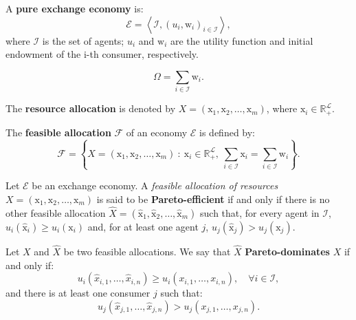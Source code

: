 \documentclass[8pt,a4paper]{extarticle}
\begin{document}
\begin{multicols}{3}
  \begin{boxdef}
    A \textbf{pure exchange economy} is: $$\mathcal{E} = \left\langle \mathcal{I}, (u_i, \mathrm{w}_i)_{i \in \mathcal{I}} \right\rangle,$$  where $\mathcal{I}$ is the set of agents; $u_i$ and $\mathrm{w}_i$ are the utility function and initial endowment of the i-th consumer, respectively.
  \end{boxdef}

  \begin{boxdef}
    \[
      \Omega = \sum_{i \in \mathcal{I}} \mathrm{w}_i
      .\]
  \end{boxdef}

  \begin{boxdef}
    The \textbf{resource allocation} is denoted by $X = (\mathrm{x}_1, \mathrm{x}_2, \ldots, \mathrm{x}_m)$, where $\displaystyle \mathrm{x}_i \in \mathbb{R}_{+}^{\mathcal{L}}$.
  \end{boxdef}

  \begin{boxdef}
    The \textbf{feasible allocation} $\mathcal{F}$ of an economy $\mathcal{E}$ is defined by:
    \[
      \mathcal{F} = \left\{ X = (\mathrm{x}_1, \mathrm{x}_2, \ldots, \mathrm{x}_m)\ :\ \mathrm{x}_i \in \mathbb{R}_{+}^{\mathcal{L}},\ \sum_{i \in \mathcal{I}} \mathrm{x}_i = \sum_{i \in \mathcal{I}} \mathrm{w}_i \right\}
      .\]
  \end{boxdef}

  \begin{boxdef}
    Let $\mathcal{E}$ be an exchange economy. A \emph{feasible allocation of resources} $X = (\mathrm{x}_1, \mathrm{x}_2, \ldots, \mathrm{x}_m)$ is said to be \textbf{Pareto-efficient} if and only if there is no other feasible allocation $\hat{X} = (\hat{\mathrm{x}}_1, \hat{\mathrm{x}}_2, \ldots, \hat{\mathrm{x}}_m)$ such that, for every agent in $\mathcal{I}$, $u_i(\hat{\mathrm{x}}_i) \ge u_i(\mathrm{x}_i)$ and, for at least one agent $j$, $u_{j} (\hat{\mathrm{x}}_{j}) > u_{j} (\mathrm{x}_{j})$.
  \end{boxdef}

  \begin{boxdef}
    Let $X$ and $\hat{X}$ be two feasible allocations. We say that $\hat{X}$ \textbf{Pareto-dominates} $X$ if and only if:
    \[
      u_i (\hat{x}_{i, 1}, \ldots, \hat{x}_{i, n}) \ge u_i (x_{i, 1}, \ldots, x_{i, n}), \quad \forall i \in \mathcal{I}
      ,\]
    and there is at least one consumer $j$ such that:
    \[
      u_j (\hat{x}_{j, 1}, \ldots, \hat{x}_{j, n}) > u_j (x_{j, 1}, \ldots, x_{j, n})
      .\]
  \end{boxdef}


\end{multicols}
\end{document}

